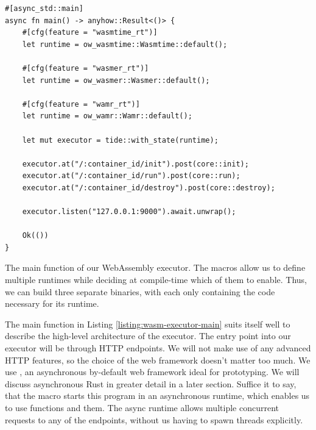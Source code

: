 \begin{listing}[ht]
    \begin{verbatim}
#[async_std::main]
async fn main() -> anyhow::Result<()> {
    #[cfg(feature = "wasmtime_rt")]
    let runtime = ow_wasmtime::Wasmtime::default();

    #[cfg(feature = "wasmer_rt")]
    let runtime = ow_wasmer::Wasmer::default();

    #[cfg(feature = "wamr_rt")]
    let runtime = ow_wamr::Wamr::default();

    let mut executor = tide::with_state(runtime);

    executor.at("/:container_id/init").post(core::init);
    executor.at("/:container_id/run").post(core::run);
    executor.at("/:container_id/destroy").post(core::destroy);

    executor.listen("127.0.0.1:9000").await.unwrap();

    Ok(())
}
\end{verbatim}
    \caption{The main function of our WebAssembly executor. The \inl{\#[cfg(feature = "...")]} macros allow us to define multiple runtimes while deciding at compile-time which of them to enable. Thus, we can build three separate binaries, with each only containing the code necessary for its runtime.}
    \label{listing:wasm-executor-main}
\end{listing}

The main function in Listing \ref{listing:wasm-executor-main} suits itself well to describe the high-level architecture of the executor. The entry point into our executor will be through HTTP endpoints. We will not make use of any advanced HTTP features, so the choice of the web framework doesn't matter too much. We use  \cite{Turon2021}, an asynchronous by-default web framework ideal for prototyping. We will discuss asynchronous Rust in greater detail in a later section. Suffice it to say, that the  macro starts this program in an asynchronous runtime, which enables us to use  functions and  them. The async runtime allows multiple concurrent requests to any of the endpoints, without us having to spawn threads explicitly.

